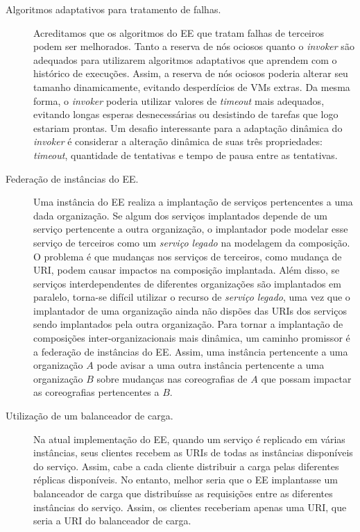 \begin{description}
\item[Algoritmos adaptativos para tratamento de falhas.] 
Acreditamos que os algoritmos do EE que tratam falhas de terceiros podem ser melhorados.
Tanto a reserva de nós ociosos quanto o \emph{invoker} são adequados 
para utilizarem algoritmos adaptativos que aprendem com o histórico de
execuções. Assim, a reserva de nós ociosos poderia alterar seu tamanho dinamicamente,
evitando desperdícios de VMs extras. Da mesma forma, o \emph{invoker}
poderia utilizar valores de \emph{timeout} mais adequados, evitando longas
esperas desnecessárias ou desistindo de tarefas que logo estariam prontas.
Um desafio interessante para a adaptação dinâmica do \emph{invoker} é
considerar a alteração dinâmica de suas três propriedades:
\emph{timeout}, quantidade de tentativas e tempo de pausa entre as tentativas.

\item[Federação de instâncias do EE.] Uma instância do EE realiza a implantação
de serviços pertencentes a uma dada organização. Se algum dos serviços implantados
depende de um serviço pertencente a outra organização, o implantador
pode modelar esse serviço de terceiros como um \emph{serviço legado}
na modelagem da composição. O problema é que mudanças nos serviços de
terceiros, como mudança de URI, podem causar impactos na composição implantada.
Além disso, se serviços interdependentes de diferentes organizações são implantados em paralelo,
torna-se difícil utilizar o recurso de \emph{serviço legado},
uma vez que o implantador de uma organização ainda não dispões das URIs 
dos serviços sendo implantados pela outra organização.
Para tornar a implantação de composições inter-organizacionais mais dinâmica,
um caminho promissor é a federação de instâncias do EE.
Assim, uma instância pertencente a uma organização $A$ pode avisar a
uma outra instância pertencente a uma organização $B$ sobre mudanças 
nas coreografias de $A$ que possam impactar as coreografias pertencentes a $B$.

\item[Utilização de um balanceador de carga.] Na atual implementação do EE,
quando um serviço é replicado em várias instâncias, seus clientes
recebem as URIs de todas as instâncias disponíveis do serviço.
Assim, cabe a cada cliente distribuir a carga pelas diferentes réplicas disponíveis.
No entanto, melhor seria que o EE implantasse um balanceador de carga 
que distribuísse as requisições entre as diferentes instâncias do serviço.
Assim, os clientes receberiam apenas uma URI, que seria a URI
do balanceador de carga.


\end{description}

